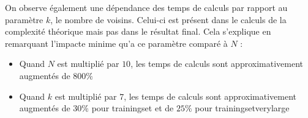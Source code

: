\documentclass[a4paper, 11pt]{article}
\begin{document}
On observe également une dépendance des temps de calculs par rapport au paramètre $k$, le nombre de voisins. Celui-ci est présent dans le calculs de la complexité théorique mais pas dans le résultat final. Cela s'explique en remarquant l'impacte minime qu'a ce paramètre comparé à $N$ :\\

\begin{itemize}
    \item Quand $N$ est multiplié par $10$, les temps de calculs sont approximativement augmentés de $800\%$
    \item Quand $k$ est multiplié par $7$, les temps de calculs sont approximativement augmentés de $30\%$ pour trainingset et de $25\%$ pour trainingsetverylarge
\end{itemize}
 
\end{document}
